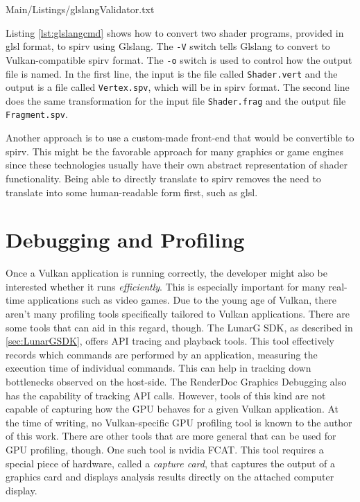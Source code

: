     
    {Main/Listings/glslangValidator.txt}


    Listing \ref{lst:glslangcmd} shows how to convert two shader programs, provided in \gls{glsl} format, to \gls{spirv} using Glslang. The \lstinline{-V} switch tells Glslang to convert to Vulkan-compatible \gls{spirv} format. The \lstinline{-o} switch is used to control how the output file is named. In the first line, the input is the file called \lstinline{Shader.vert} and the output is a file called \lstinline{Vertex.spv}, which will be in \gls{spirv} format. The second line does the same transformation for the input file \lstinline{Shader.frag} and the output file \lstinline{Fragment.spv}.

    Another approach is to use a custom-made front-end that would be convertible to \gls{spirv}. This might be the favorable approach for many graphics or game engines since these technologies usually have their own abstract representation of shader functionality. Being able to directly translate to \gls{spirv} removes the need to translate into some human-readable form first, such as \gls{glsl}.


  \section{Debugging and Profiling}
  \label{sec:DebuggingAndProfiling}

    Once a Vulkan application is running correctly, the developer might also be interested whether it runs \textit{efficiently}. This is especially important for many real-time applications such as video games. Due to the young age of Vulkan, there aren't many profiling tools specifically tailored to Vulkan applications. There are some tools that can aid in this regard, though. The LunarG SDK, as described in \ref{sec:LunarGSDK}, offers API tracing and playback tools. This tool effectively records which commands are performed by an application, measuring the execution time of individual commands. This can help in tracking down bottlenecks observed on the host-side. The RenderDoc Graphics Debugging\cite{renderdoc} also has the capability of tracking API calls. However, tools of this kind are not capable of capturing how the GPU behaves for a given Vulkan application. At the time of writing, no Vulkan-specific GPU profiling tool is known to the author of this work. There are other tools that are more general that can be used for GPU profiling, though. One such tool is \gls{nvidia} FCAT\cite{nvidiafcat}. This tool requires a special piece of hardware, called a \textit{capture card}, that captures the output of a graphics card and displays analysis results directly on the attached computer display.

